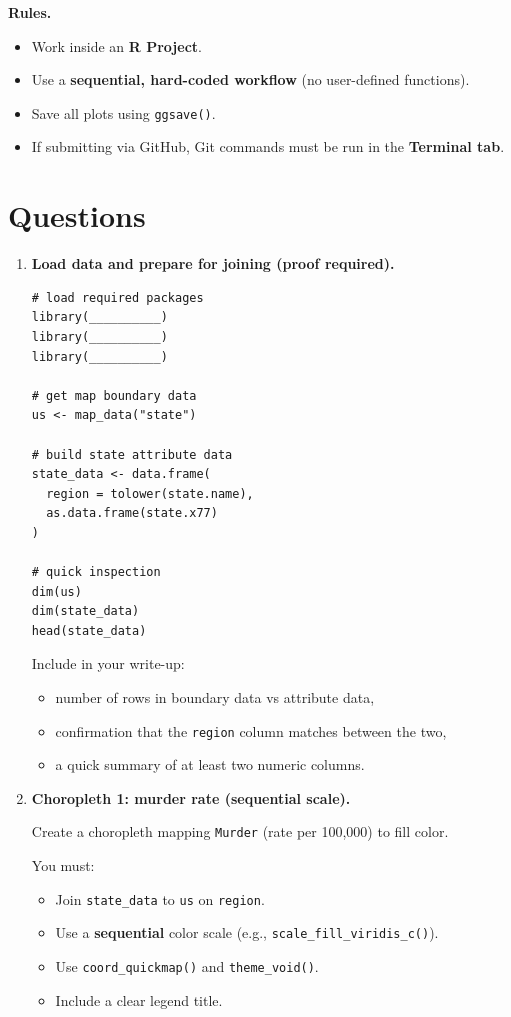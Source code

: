 \documentclass[11pt]{article}
\begin{document}
\medskip
\noindent \textbf{Rules.}
\begin{itemize}
  \item Work inside an \textbf{R Project}.
  \item Use a \textbf{sequential, hard-coded workflow} (no user-defined functions).
  \item Save all plots using \texttt{ggsave()}.
  \item If submitting via GitHub, Git commands must be run in the \textbf{Terminal tab}.
\end{itemize}

\section*{Questions}

\begin{enumerate}

\item \textbf{Load data and prepare for joining (proof required).}

\begin{verbatim}
# load required packages
library(__________)
library(__________)
library(__________)

# get map boundary data
us <- map_data("state")

# build state attribute data
state_data <- data.frame(
  region = tolower(state.name),
  as.data.frame(state.x77)
)

# quick inspection
dim(us)
dim(state_data)
head(state_data)
\end{verbatim}

Include in your write-up:
\begin{itemize}
  \item number of rows in boundary data vs attribute data,
  \item confirmation that the \texttt{region} column matches between the two,
  \item a quick summary of at least two numeric columns.
\end{itemize}

\item \textbf{Choropleth 1: murder rate (sequential scale).}

Create a choropleth mapping \texttt{Murder} (rate per 100,000) to fill color.

You must:
\begin{itemize}
  \item Join \texttt{state\_data} to \texttt{us} on \texttt{region}.
  \item Use a \textbf{sequential} color scale (e.g., \texttt{scale\_fill\_viridis\_c()}).
  \item Use \texttt{coord\_quickmap()} and \texttt{theme\_void()}.
  \item Include a clear legend title.
\end{itemize}


\end{enumerate}
\end{document}
